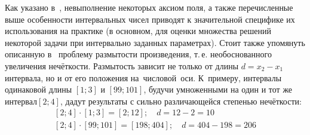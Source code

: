 Как указано в~\cite{Levin}, невыполнение некоторых аксиом поля, а также перечисленные выше особенности интервальных чисел приводят к значительной специфике их использования на практике (в основном, для оценки множества решений некоторой задачи при интервально заданных параметрах). Стоит также упомянуть описанную в~\cite{Spesivtsev, Yakhyaeva} проблему размытости произведения, т.\,е. необоснованного увеличения нечёткости. Размытость зависит не только от длины $d={{x}_{2}}-{{x}_{1}}$ интервала, но и от его положения на~числовой~оси. К~примеру, интервалы одинаковой длины $\left[ 1;3 \right]$ и $\left[ 99;101 \right]$, будучи умноженными на один и тот же интервал$\left[ 2;4 \right]$, дадут результаты с сильно различающейся степенью нечёткости:
\begin{equation*}
	\begin{matrix}
		\left[ 2;4 \right]\cdot \left[ 1;3 \right]=\left[ 2;12 \right];\quad d=12-2=10 \\ 
		\left[ 2;4 \right]\cdot \left[ 99;101 \right]=\left[ 198;404 \right];\quad d=404-198=206 
	\end{matrix}
\end{equation*}


